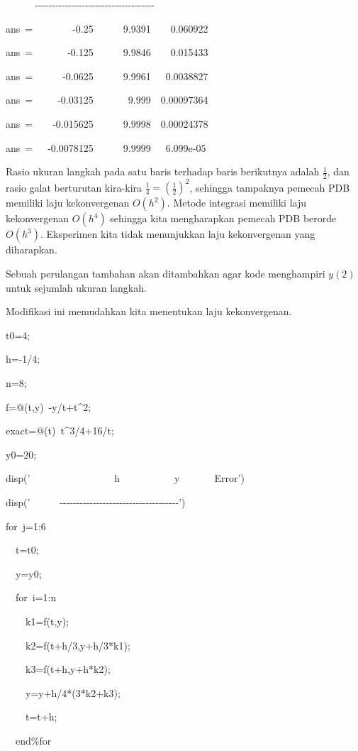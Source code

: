 \begin{description}
\begin{lyxcode}
~~~~~~-{}-{}-{}-{}-{}-{}-{}-{}-{}-{}-{}-{}-{}-{}-{}-{}-{}-{}-{}-{}-{}-{}-{}-{}-{}-{}-{}-{}-{}-{}-{}-{}-{}-{}-{}-

ans~=~~~~~~~~-0.25~~~~~~9.9391~~~~0.060922

ans~=~~~~~~~-0.125~~~~~~9.9846~~~~0.015433

ans~=~~~~~~-0.0625~~~~~~9.9961~~~0.0038827

ans~=~~~~~-0.03125~~~~~~~9.999~~0.00097364

ans~=~~~~-0.015625~~~~~~9.9998~~0.00024378

ans~=~~~-0.0078125~~~~~~9.9999~~~6.099e-05
\end{lyxcode}
Rasio ukuran langkah pada satu baris terhadap baris berikutnya adalah
$\frac{1}{2}$, dan rasio galat berturutan kira-kira $\frac{1}{4}=\left(\frac{1}{2}\right)^{2}$,
sehingga tampaknya pemecah PDB memiliki laju kekonvergenan $O(h^{2})$.
Metode integrasi memiliki laju kekonvergenan $O(h^{4})$ sehingga
kita mengharapkan pemecah PDB berorde $O(h^{3})$. Eksperimen kita
tidak menunjukkan laju kekonvergenan yang diharapkan.
\item [{\ref{exc:ode-rungeKutta-16}e:}] Sebuah perulangan tambahan akan
ditambahkan agar kode menghampiri $y(2)$ untuk sejumlah ukuran langkah.

Modifikasi ini memudahkan kita menentukan laju kekonvergenan.
\begin{lyxcode}
t0=4;

h=-1/4;

n=8;

f=@(t,y)~-y/t+t\textasciicircum 2;

exact=@(t)~t\textasciicircum 3/4+16/t;

y0=20;

disp('~~~~~~~~~~~~~~~~~h~~~~~~~~~~~y~~~~~~~Error')

disp('~~~~~~-{}-{}-{}-{}-{}-{}-{}-{}-{}-{}-{}-{}-{}-{}-{}-{}-{}-{}-{}-{}-{}-{}-{}-{}-{}-{}-{}-{}-{}-{}-{}-{}-{}-{}-{}-')

for~j=1:6

~~t=t0;

~~y=y0;

~~for~i=1:n

~~~~k1=f(t,y);

~~~~k2=f(t+h/3,y+h/3{*}k1);

~~~~k3=f(t+h,y+h{*}k2);

~~~~y=y+h/4{*}(3{*}k2+k3);

~~~~t=t+h;

~~end\%for


\end{lyxcode}
\end{description}
